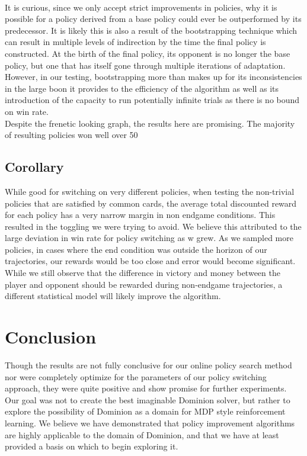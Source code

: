 \documentclass{article}
\begin{document}
  \\
  It is curious, since we only accept strict improvements in policies, why it is possible for a policy derived from a base policy could ever be outperformed by its predecessor. It is likely this is also a result of the bootstrapping technique which can result in multiple levels of indirection by the time the final policy is constructed. At the birth of the final policy, its opponent is no longer the base policy, but one that has itself gone through multiple iterations of adaptation. However, in our testing, bootstrapping more than makes up for its inconsistencies in the large boon it provides to the efficiency of the algorithm as well as its introduction of the capacity to run potentially infinite trials as there is no bound on win rate.
  \\
  Despite the frenetic looking graph, the results here are promising. The majority of resulting policies won well over 50%
\\
  \subsection{Corollary}
While good for switching on very different policies, when testing the non-trivial policies that are satisfied by common cards, the average total discounted reward for each policy has a very narrow margin in non endgame conditions. This resulted in the toggling we were trying to avoid. We believe this attributed to the large deviation in win rate for policy switching as w grew. As we sampled more policies, in cases where the end condition was outside the horizon of our trajectories, our rewards would be too close and error would become significant. While we still observe that the difference in victory and money between the player and opponent should be rewarded during non-endgame trajectories, a different statistical model will likely improve the algorithm.
\section{Conclusion}
Though the results are not fully conclusive for our online policy search method nor were completely optimize for the parameters of our policy switching approach, they were quite positive and show promise for further experiments. Our goal was not to create the best imaginable Dominion solver, but rather to explore the possibility of Dominion as a domain for MDP style reinforcement learning. We believe we have demonstrated that policy improvement algorithms are highly applicable to the domain of Dominion, and that we have at least provided a basis on which to begin exploring it.
\end{document}
